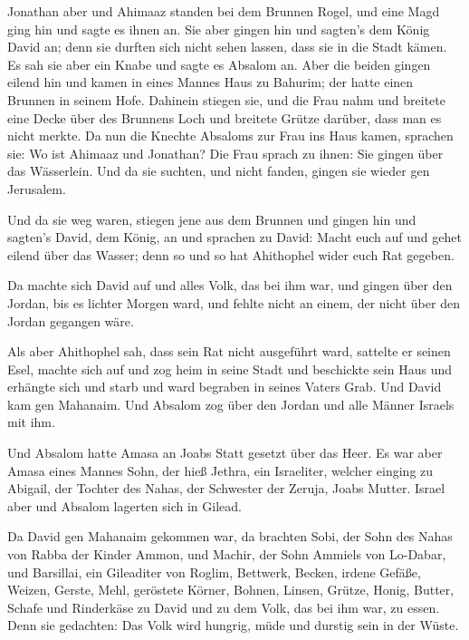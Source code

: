  Jonathan aber und Ahimaaz standen bei dem Brunnen Rogel,
und eine Magd ging hin und sagte es ihnen an. Sie aber gingen hin und
sagten's dem König David an; denn sie durften sich nicht sehen lassen,
dass sie in die Stadt kämen.  Es sah sie aber ein Knabe
und sagte es Absalom an. Aber die beiden gingen eilend hin und kamen in
eines Mannes Haus zu Bahurim; der hatte einen Brunnen in seinem Hofe.
Dahinein stiegen sie,  und die Frau nahm und breitete
eine Decke über des Brunnens Loch und breitete Grütze darüber, dass man
es nicht merkte.  Da nun die Knechte Absaloms zur Frau
ins Haus kamen, sprachen sie: Wo ist Ahimaaz und Jonathan? Die Frau
sprach zu ihnen: Sie gingen über das Wässerlein. Und da sie suchten, und
nicht fanden, gingen sie wieder gen Jerusalem.

 Und da sie weg waren, stiegen jene aus dem Brunnen und
gingen hin und sagten's David, dem König, an und sprachen zu David:
Macht euch auf und gehet eilend über das Wasser; denn so und so hat
Ahithophel wider euch Rat gegeben.

 Da machte sich David auf und alles Volk, das bei ihm
war, und gingen über den Jordan, bis es lichter Morgen ward, und fehlte
nicht an einem, der nicht über den Jordan gegangen wäre.

 Als aber Ahithophel sah, dass sein Rat nicht ausgeführt
ward, sattelte er seinen Esel, machte sich auf und zog heim in seine
Stadt und beschickte sein Haus und erhängte sich und starb und ward
begraben in seines Vaters Grab.  Und David kam gen
Mahanaim. Und Absalom zog über den Jordan und alle Männer Israels mit
ihm.

 Und Absalom hatte Amasa an Joabs Statt gesetzt über das
Heer. Es war aber Amasa eines Mannes Sohn, der hieß Jethra, ein
Israeliter, welcher einging zu Abigail, der Tochter des Nahas, der
Schwester der Zeruja, Joabs Mutter.  Israel aber und
Absalom lagerten sich in Gilead.

 Da David gen Mahanaim gekommen war, da brachten Sobi,
der Sohn des Nahas von Rabba der Kinder Ammon, und Machir, der Sohn
Ammiels von Lo-Dabar, und Barsillai, ein Gileaditer von Roglim,
 Bettwerk, Becken, irdene Gefäße, Weizen, Gerste, Mehl,
geröstete Körner, Bohnen, Linsen, Grütze,  Honig, Butter,
Schafe und Rinderkäse zu David und zu dem Volk, das bei ihm war, zu
essen. Denn sie gedachten: Das Volk wird hungrig, müde und durstig sein
in der Wüste.


